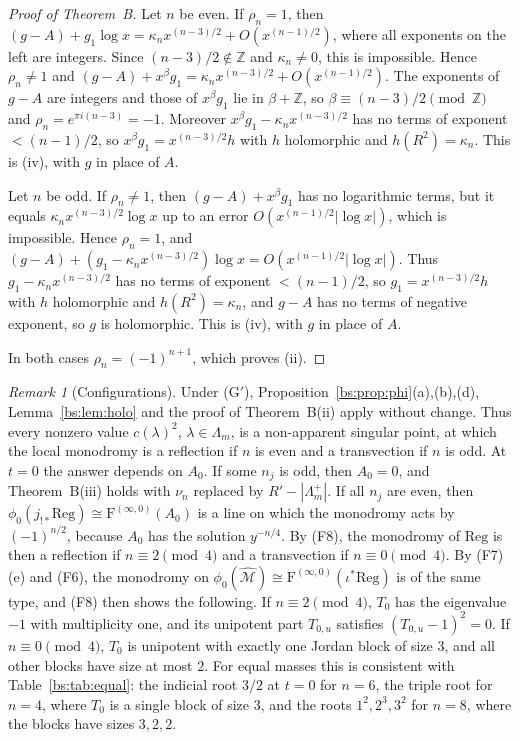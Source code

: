 \documentclass[11pt,a4paper]{article}
\theoremstyle{definition}
\theoremstyle{remark}
\newtheorem{remark}[theorem]{Remark}
\numberwithin{equation}{section}
\newcommand{\Z}{\mathbb{Z}}
\newcommand{\cM}{\mathcal{M}}
\newcommand{\Four}{\mathrm{F}}
\newcommand{\Mhat}{\widehat{\cM}}
\begin{document}
\begin{proof}[Proof of Theorem~B]
Let $n$ be even. If $\rho_n=1$, then $(g-A)+g_1\log x=\kappa_nx^{(n-3)/2}+O(x^{(n-1)/2})$, where all exponents on the left are integers. Since $(n-3)/2\notin\Z$ and $\kappa_n\ne0$, this is impossible. Hence $\rho_n\ne1$ and $(g-A)+x^\beta g_1=\kappa_nx^{(n-3)/2}+O(x^{(n-1)/2})$. The exponents of $g-A$ are integers and those of $x^\beta g_1$ lie in $\beta+\Z$, so $\beta\equiv(n-3)/2\pmod\Z$ and $\rho_n=e^{\pi i(n-3)}=-1$. Moreover $x^\beta g_1-\kappa_nx^{(n-3)/2}$ has no terms of exponent $<(n-1)/2$, so $x^\beta g_1=x^{(n-3)/2}h$ with $h$ holomorphic and $h(R^2)=\kappa_n$. This is (iv), with $g$ in place of $A$.

Let $n$ be odd. If $\rho_n\ne1$, then $(g-A)+x^\beta g_1$ has no logarithmic terms, but it equals $\kappa_nx^{(n-3)/2}\log x$ up to an error $O(x^{(n-1)/2}|\log x|)$, which is impossible. Hence $\rho_n=1$, and $(g-A)+(g_1-\kappa_nx^{(n-3)/2})\log x=O(x^{(n-1)/2}|\log x|)$. Thus $g_1-\kappa_nx^{(n-3)/2}$ has no terms of exponent $<(n-1)/2$, so $g_1=x^{(n-3)/2}h$ with $h$ holomorphic and $h(R^2)=\kappa_n$, and $g-A$ has no terms of negative exponent, so $g$ is holomorphic. This is (iv), with $g$ in place of $A$.

In both cases $\rho_n=(-1)^{n+1}$, which proves (ii).
\end{proof}

\begin{remark}[Configurations]\label{bs:rem:config}
Under (G$'$), Proposition~\ref{bs:prop:phi}(a),(b),(d), Lemma~\ref{bs:lem:holo} and the proof of Theorem~B(ii) apply without change. Thus every nonzero value $c(\lambda)^2$, $\lambda\in\Lambda_m$, is a non-apparent singular point, at which the local monodromy is a reflection if $n$ is even and a transvection if $n$ is odd. At $t=0$ the answer depends on $A_0$. If some $n_j$ is odd, then $A_0=0$, and Theorem~B(iii) holds with $\nu_n$ replaced by $R'-|\Lambda_m^+|$. If all $n_j$ are even, then $\phi_0(j_{!*}\mathrm{Reg})\cong\Four^{(\infty,0)}(A_0)$ is a line on which the monodromy acts by $(-1)^{n/2}$, because $A_0$ has the solution $y^{-n/4}$. By (F8), the monodromy of $\mathrm{Reg}$ is then a reflection if $n\equiv2\pmod4$ and a transvection if $n\equiv0\pmod4$. By (F7)(e) and (F6), the monodromy on $\phi_0(\Mhat)\cong\Four^{(\infty,0)}(\iota^*\mathrm{Reg})$ is of the same type, and (F8) then shows the following. If $n\equiv2\pmod4$, $T_0$ has the eigenvalue $-1$ with multiplicity one, and its unipotent part $T_{0,u}$ satisfies $(T_{0,u}-1)^2=0$. If $n\equiv0\pmod4$, $T_0$ is unipotent with exactly one Jordan block of size $3$, and all other blocks have size at most $2$. For equal masses this is consistent with Table~\ref{bs:tab:equal}: the indicial root $3/2$ at $t=0$ for $n=6$, the triple root for $n=4$, where $T_0$ is a single block of size $3$, and the roots $1^2,2^3,3^2$ for $n=8$, where the blocks have sizes $3,2,2$.
\end{remark}
\end{document}
